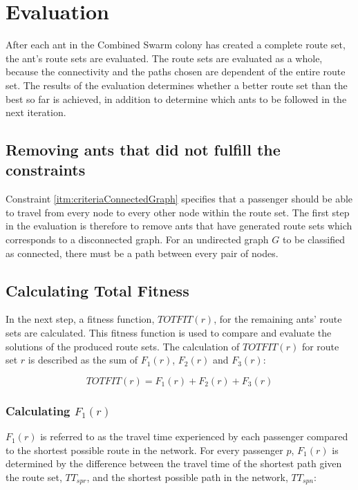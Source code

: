 \section{Evaluation}
\label{sec:algoEvaluation}
After each ant in the Combined Swarm colony has created a complete route set, the ant's route sets are evaluated. The route sets are evaluated as a whole, because the connectivity and the paths chosen are dependent of the entire route set. The results of the evaluation determines whether a better route set than the best so far is achieved, in addition to determine which ants to be followed in the next iteration. 

\subsection{Removing ants that did not fulfill the constraints}
\label{sec:algoRemoval}
Constraint \vref{itm:criteriaConnectedGraph} specifies that a passenger should be able to travel from every node to every other node within the route set. The first step in the evaluation is therefore to remove ants that have generated route sets which corresponds to a disconnected graph. For an undirected graph $G$ to be classified as connected, there must be a path between every pair of nodes. 

\subsection{Calculating Total Fitness}
\label{sec:totfit}
In the next step, a fitness function, $TOTFIT(r)$, for the remaining ants' route sets are calculated. This fitness function is used to compare and evaluate the solutions of the produced route sets. The calculation of $TOTFIT(r)$ for route set $r$ is described as the sum of $F_{1}(r)$, $F_{2}(r)$ and $F_{3}(r)$: 

$$ TOTFIT(r) = F_{1}(r) + F_{2}(r) + F_{3}(r)$$

\subsubsection{Calculating $F_{1}(r)$}
\label{sec:f1}
$F_{1}(r)$ is referred to as the travel time experienced by each passenger compared to the shortest possible route in the network. For every passenger $p$, $F_{1}(r)$ is determined by the difference between the travel time of the shortest path given the route set, $TT_{spr}$, and the shortest possible path in the network, $TT_{spn}$:

